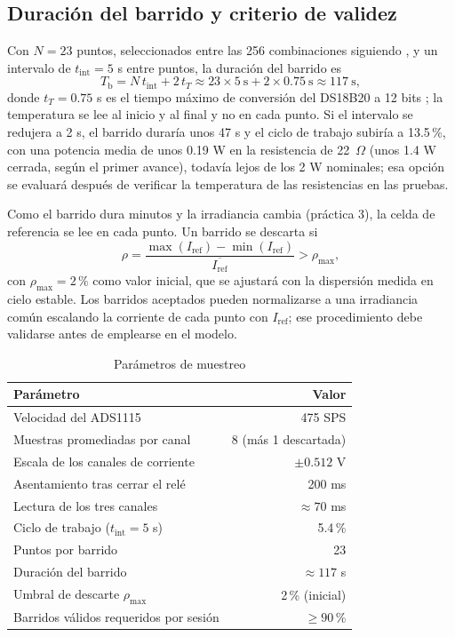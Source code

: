 \documentclass[10pt,letterpaper,twocolumn]{article}
\begin{document}
\subsection{Duración del barrido y criterio de validez}
Con $N=23$ puntos, seleccionados entre las 256 combinaciones siguiendo \cite{machado}, y un intervalo de $t_\mathrm{int}=5$ s entre puntos, la duración del barrido es
\begin{equation}
T_\mathrm{b}=N\,t_\mathrm{int}+2\,t_T\approx 23\times 5\ \mathrm{s}+2\times 0.75\ \mathrm{s}\approx 117\ \mathrm{s},
\end{equation}
donde $t_T=0.75$ s es el tiempo máximo de conversión del DS18B20 a 12 bits \cite{ds18b20}; la temperatura se lee al inicio y al final y no en cada punto. Si el intervalo se redujera a 2 s, el barrido duraría unos 47 s y el ciclo de trabajo subiría a 13.5\,\%, con una potencia media de unos 0.19 W en la resistencia de 22~$\Omega$ (unos 1.4 W cerrada, según el primer avance), todavía lejos de los 2 W nominales; esa opción se evaluará después de verificar la temperatura de las resistencias en las pruebas.

Como el barrido dura minutos y la irradiancia cambia (práctica 3), la celda de referencia se lee en cada punto. Un barrido se descarta si
\begin{equation}
\rho=\frac{\max(I_\mathrm{ref})-\min(I_\mathrm{ref})}{\overline{I_\mathrm{ref}}}>\rho_\mathrm{max},
\end{equation}
con $\rho_\mathrm{max}=2\,\%$ como valor inicial, que se ajustará con la dispersión medida en cielo estable. Los barridos aceptados pueden normalizarse a una irradiancia común escalando la corriente de cada punto con $I_\mathrm{ref}$; ese procedimiento debe validarse antes de emplearse en el modelo.

\begin{table}[t]
\centering
\caption{Parámetros de muestreo}
\label{tab:muestreo}
\footnotesize
\begin{tabularx}{\columnwidth}{@{}Xr@{}}
\toprule
Parámetro & Valor\\
\midrule
Velocidad del ADS1115 & 475 SPS\\
Muestras promediadas por canal & 8 (más 1 descartada)\\
Escala de los canales de corriente & $\pm 0.512$ V\\
Asentamiento tras cerrar el relé & 200 ms\\
Lectura de los tres canales & $\approx 70$ ms\\
Ciclo de trabajo ($t_\mathrm{int}=5$ s) & 5.4\,\%\\
Puntos por barrido & 23\\
Duración del barrido & $\approx 117$ s\\
Umbral de descarte $\rho_\mathrm{max}$ & 2\,\% (inicial)\\
Barridos válidos requeridos por sesión & $\geq 90$\,\%\\
\bottomrule
\end{tabularx}
\end{table}
\end{document}
